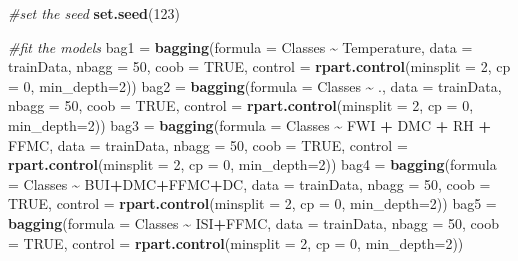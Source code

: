 \documentclass[
]{article}
\newenvironment{Shaded}{\begin{snugshade}}{\end{snugshade}}
\newcommand{\AttributeTok}[1]{\textcolor[rgb]{0.13,0.29,0.53}{#1}}
\newcommand{\CommentTok}[1]{\textcolor[rgb]{0.56,0.35,0.01}{\textit{#1}}}
\newcommand{\ConstantTok}[1]{\textcolor[rgb]{0.56,0.35,0.01}{#1}}
\newcommand{\DecValTok}[1]{\textcolor[rgb]{0.00,0.00,0.81}{#1}}
\newcommand{\FunctionTok}[1]{\textcolor[rgb]{0.13,0.29,0.53}{\textbf{#1}}}
\newcommand{\NormalTok}[1]{#1}
\newcommand{\OtherTok}[1]{\textcolor[rgb]{0.56,0.35,0.01}{#1}}
\newcommand{\SpecialCharTok}[1]{\textcolor[rgb]{0.81,0.36,0.00}{\textbf{#1}}}
\begin{document}
\begin{Shaded}
\begin{Highlighting}[]
\CommentTok{\#set the seed}
\FunctionTok{set.seed}\NormalTok{(}\DecValTok{123}\NormalTok{)}

\CommentTok{\#fit the models}
\NormalTok{bag1 }\OtherTok{=} \FunctionTok{bagging}\NormalTok{(}\AttributeTok{formula =}\NormalTok{ Classes }\SpecialCharTok{\textasciitilde{}}\NormalTok{ Temperature, }\AttributeTok{data =}\NormalTok{ trainData, }\AttributeTok{nbagg =} \DecValTok{50}\NormalTok{,    }\AttributeTok{coob =} \ConstantTok{TRUE}\NormalTok{, }\AttributeTok{control =} \FunctionTok{rpart.control}\NormalTok{(}\AttributeTok{minsplit =} \DecValTok{2}\NormalTok{, }\AttributeTok{cp =} \DecValTok{0}\NormalTok{, }\AttributeTok{min\_depth=}\DecValTok{2}\NormalTok{))}
\NormalTok{bag2 }\OtherTok{=} \FunctionTok{bagging}\NormalTok{(}\AttributeTok{formula =}\NormalTok{ Classes }\SpecialCharTok{\textasciitilde{}}\NormalTok{ ., }\AttributeTok{data =}\NormalTok{ trainData, }\AttributeTok{nbagg =} \DecValTok{50}\NormalTok{,    }\AttributeTok{coob =} \ConstantTok{TRUE}\NormalTok{, }\AttributeTok{control =} \FunctionTok{rpart.control}\NormalTok{(}\AttributeTok{minsplit =} \DecValTok{2}\NormalTok{, }\AttributeTok{cp =} \DecValTok{0}\NormalTok{, }\AttributeTok{min\_depth=}\DecValTok{2}\NormalTok{))}
\NormalTok{bag3 }\OtherTok{=} \FunctionTok{bagging}\NormalTok{(}\AttributeTok{formula =}\NormalTok{ Classes }\SpecialCharTok{\textasciitilde{}}\NormalTok{ FWI }\SpecialCharTok{+}\NormalTok{ DMC }\SpecialCharTok{+}\NormalTok{ RH }\SpecialCharTok{+}\NormalTok{ FFMC, }\AttributeTok{data =}\NormalTok{ trainData, }\AttributeTok{nbagg =} \DecValTok{50}\NormalTok{,    }\AttributeTok{coob =} \ConstantTok{TRUE}\NormalTok{, }\AttributeTok{control =} \FunctionTok{rpart.control}\NormalTok{(}\AttributeTok{minsplit =} \DecValTok{2}\NormalTok{, }\AttributeTok{cp =} \DecValTok{0}\NormalTok{, }\AttributeTok{min\_depth=}\DecValTok{2}\NormalTok{))}
\NormalTok{bag4 }\OtherTok{=} \FunctionTok{bagging}\NormalTok{(}\AttributeTok{formula =}\NormalTok{ Classes }\SpecialCharTok{\textasciitilde{}}\NormalTok{ BUI}\SpecialCharTok{+}\NormalTok{DMC}\SpecialCharTok{+}\NormalTok{FFMC}\SpecialCharTok{+}\NormalTok{DC, }\AttributeTok{data =}\NormalTok{ trainData, }\AttributeTok{nbagg =} \DecValTok{50}\NormalTok{,    }\AttributeTok{coob =} \ConstantTok{TRUE}\NormalTok{, }\AttributeTok{control =} \FunctionTok{rpart.control}\NormalTok{(}\AttributeTok{minsplit =} \DecValTok{2}\NormalTok{, }\AttributeTok{cp =} \DecValTok{0}\NormalTok{, }\AttributeTok{min\_depth=}\DecValTok{2}\NormalTok{))}
\NormalTok{bag5 }\OtherTok{=} \FunctionTok{bagging}\NormalTok{(}\AttributeTok{formula =}\NormalTok{ Classes }\SpecialCharTok{\textasciitilde{}}\NormalTok{ ISI}\SpecialCharTok{+}\NormalTok{FFMC, }\AttributeTok{data =}\NormalTok{ trainData, }\AttributeTok{nbagg =} \DecValTok{50}\NormalTok{,    }\AttributeTok{coob =} \ConstantTok{TRUE}\NormalTok{, }\AttributeTok{control =} \FunctionTok{rpart.control}\NormalTok{(}\AttributeTok{minsplit =} \DecValTok{2}\NormalTok{, }\AttributeTok{cp =} \DecValTok{0}\NormalTok{, }\AttributeTok{min\_depth=}\DecValTok{2}\NormalTok{))}


\end{Highlighting}
\end{Shaded}
\end{document}
